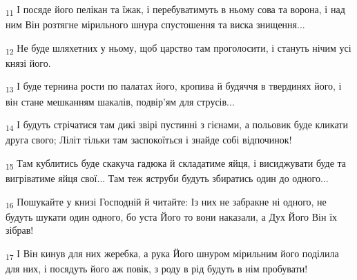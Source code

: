 \begin{tcolorbox}
\textsubscript{11} І посяде його пелікан та їжак, і перебуватимуть в ньому сова та ворона, і над ним Він розтягне мірильного шнура спустошення та виска знищення...
\end{tcolorbox}
\begin{tcolorbox}
\textsubscript{12} Не буде шляхетних у ньому, щоб царство там проголосити, і стануть нічим усі князі його.
\end{tcolorbox}
\begin{tcolorbox}
\textsubscript{13} І буде тернина рости по палатах його, кропива й будяччя в твердинях його, і він стане мешканням шакалів, подвір'ям для струсів...
\end{tcolorbox}
\begin{tcolorbox}
\textsubscript{14} І будуть стрічатися там дикі звірі пустинні з гієнами, а польовик буде кликати друга свого; Ліліт тільки там заспокоїться і знайде собі відпочинок!
\end{tcolorbox}
\begin{tcolorbox}
\textsubscript{15} Там кублитись буде скакуча гадюка й складатиме яйця, і висиджувати буде та вигріватиме яйця свої... Там теж яструби будуть збиратись один до одного...
\end{tcolorbox}
\begin{tcolorbox}
\textsubscript{16} Пошукайте у книзі Господній й читайте: Із них не забракне ні одного, не будуть шукати один одного, бо уста Його то вони наказали, а Дух Його Він їх зібрав!
\end{tcolorbox}
\begin{tcolorbox}
\textsubscript{17} І Він кинув для них жеребка, а рука Його шнуром мірильним його поділила для них, і посядуть його аж повік, з роду в рід будуть в нім пробувати!
\end{tcolorbox}
